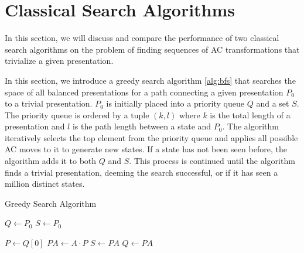 
\section{Classical Search Algorithms} \label{sec:search}

In this section, we will discuss and compare the performance of two classical search algorithms on the problem of finding sequences of AC transformations that trivialize a given presentation. 



In this section, we introduce a greedy search algorithm \autoref{alg:bfs} that searches the space of all balanced presentations for a path connecting a given presentation $P_0$ to a trivial presentation.
$P_0$ is initially placed into a priority queue $Q$ and a set $S$. The priority queue is ordered by a tuple $(k, l)$ where $k$ is the total length of a presentation and $l$ is the path length between a state and $P_0$. The algorithm iteratively selects the top element from the priority queue and applies all possible AC moves to it to generate new states. If a state has not been seen before, the algorithm adds it to both $Q$ and $S$. This process is continued until the algorithm finds a trivial presentation, deeming the search successful, or if it has seen a million distinct states. 
\newline

\begin{algorithm}
	\caption{Greedy Search Algorithm}\label{alg:bfs}
	\begin{algorithmic}
		\State $Q \gets P_0$ 
		\State $S \gets P_0$ 

		 
		\State $P \gets Q[0]$ 
		\State $PA \gets A \cdot P$ 
		\State $S \gets PA$
		\State $Q \gets PA$ 

		\EndIf
		\EndFor
		\EndWhile
	\end{algorithmic}
\end{algorithm}

